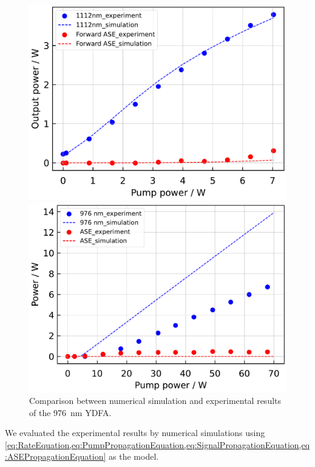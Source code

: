 \documentclass{osa-article}
\begin{document}
\begin{figure}[h!]
  \begin{minipage}[b]{0.5\linewidth}
    \centering
    \includegraphics[keepaspectratio, width=0.9\linewidth]{./Figure/1112nmYDFA2ndStageOutput_ComparisonBetweenSimAndExp.pdf}
  \end{minipage}\caption{Comparison between numerical simulation and experimental results of the \SI{976}{\nm} YDFA.}
  \begin{minipage}[b]{0.5\linewidth}
    \centering
    \includegraphics[keepaspectratio, width=0.9\linewidth]{./Figure/CompareSimAndExp_Yb1200-20-125DC-PM438mm_915Pump976Seed0.24W.pdf}
  \end{minipage}
  \label{fig:ComparisonBetweenSimAndExpOfYDFA}
\end{figure}

We evaluated the experimental results by numerical simulations using \cref{eq:RateEquation,eq:PumpPropagationEquation,eq:SignalPropagationEquation,eq:ASEPropagationEquation} as the model.
\end{document}
